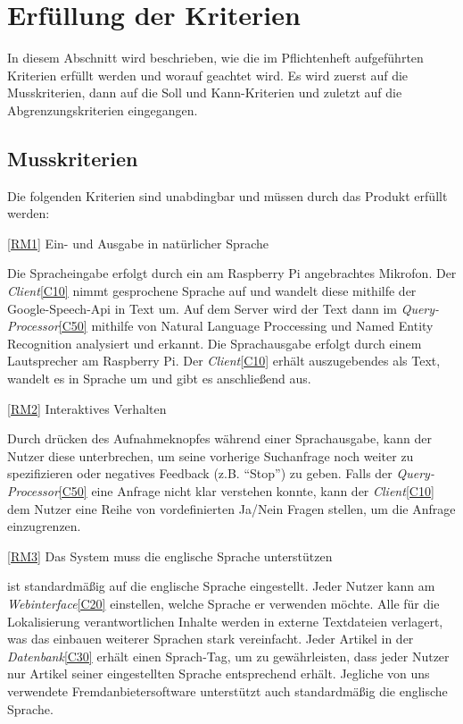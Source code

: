 
\chapter{Erfüllung der Kriterien}

In diesem Abschnitt wird beschrieben, wie die im Pflichtenheft aufgeführten Kriterien erfüllt
werden und worauf geachtet wird. Es wird zuerst auf die Musskriterien, dann auf die Soll und Kann-Kriterien und zuletzt auf die Abgrenzungskriterien eingegangen.


\section{Musskriterien}

Die folgenden Kriterien sind unabdingbar und müssen durch das Produkt erfüllt
werden:

\ref{RM1} Ein- und Ausgabe in natürlicher Sprache

Die Spracheingabe erfolgt durch ein am Raspberry Pi angebrachtes Mikrofon. Der \textit{Client}\ref{C10} nimmt gesprochene Sprache auf und wandelt diese mithilfe der Google-Speech-Api in Text um.
Auf dem Server wird der Text dann im \textit{Query-Processor}\ref{C50} mithilfe von Natural Language Proccessing und Named Entity Recognition analysiert und erkannt.
Die Sprachausgabe erfolgt durch einem Lautsprecher am Raspberry Pi. Der \textit{Client}\ref{C10} erhält auszugebendes als Text, wandelt es in Sprache um und gibt es anschließend aus.

\ref{RM2} Interaktives Verhalten

Durch drücken des Aufnahmeknopfes während einer Sprachausgabe, kann der Nutzer diese unterbrechen, um seine vorherige Suchanfrage noch weiter zu spezifizieren oder negatives Feedback (z.B. "`Stop"') zu geben.
Falls der \textit{Query-Processor}\ref{C50} eine Anfrage nicht klar verstehen konnte, kann der \textit{Client}\ref{C10} dem Nutzer eine Reihe von vordefinierten Ja/Nein Fragen stellen, um die Anfrage einzugrenzen.

\ref{RM3} Das System muss die englische Sprache unterstützen

\NewsGenie ist standardmäßig auf die englische Sprache eingestellt.
Jeder Nutzer kann am \textit{Webinterface}\ref{C20} einstellen, welche Sprache er verwenden möchte. 
Alle für die Lokalisierung verantwortlichen Inhalte werden in externe Textdateien verlagert, was das einbauen weiterer Sprachen stark vereinfacht.
Jeder Artikel in der \textit{Datenbank}\ref{C30} erhält einen Sprach-Tag, um zu
gewährleisten, dass jeder Nutzer nur Artikel seiner eingestellten Sprache entsprechend erhält.
Jegliche von uns verwendete Fremdanbietersoftware unterstützt auch standardmäßig die englische Sprache.


